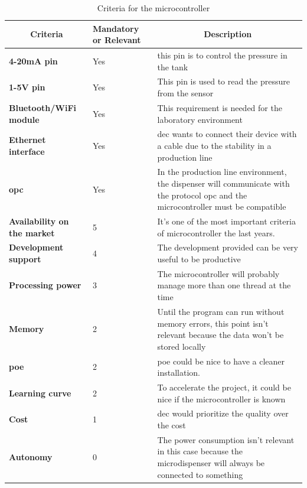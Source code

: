 \begin{table}[ht]
    \centering
    \begin{tabular}{|p{2.6cm}|p{2cm}|p{8cm}|}
    \hline
    \multicolumn{1}{|c|}{\textbf{Criteria}} &
      \textbf{Mandatory or Relevant} &
      \multicolumn{1}{c|}{\textbf{Description}} \\ \hline
      \textbf{4-20mA pin}                  & Yes & this pin is to control the pressure in the tank \\ \hline
      \textbf{1-5V pin}                    & Yes & This pin is used to read the pressure from the sensor \\ \hline
      \textbf{Bluetooth/WiFi module}       & Yes & This requirement is needed for the laboratory environment \\ \hline
      \textbf{Ethernet interface}          & Yes & \acrshort{dec} wants to connect their device with a cable due to the stability in a production line \\ \hline
      \textbf{\acrshort{opc}}              & Yes & In the production line environment, the dispenser will communicate with the protocol \acrshort{opc} and the microcontroller must be compatible \\ \hline
      \textbf{Availability on the market} & 5 & It's one of the most important criteria of microcontroller the last years.\\ \hline
      \textbf{Development support}         & 4 & The development provided can be very useful to be productive \\ \hline
      \textbf{Processing power}            & 3 & The microcontroller will probably manage more than one thread at the time \\ \hline
      \textbf{Memory}                      & 2 & Until the program can run without memory errors, this point isn't relevant because the data won't be stored locally \\ \hline
      \textbf{\acrshort{poe}}              & 2 & \acrfull{poe} could be nice to have a cleaner installation. \\ \hline
      \textbf{Learning curve}              & 2 & To accelerate the project, it could be nice if the microcontroller is known \\ \hline
      \textbf{Cost}                        & 1 & \acrshort{dec} would prioritize the quality over the cost \\ \hline
    \textbf{Autonomy} &
      0 &
      The power consumption isn't relevant in this case because the microdispenser will always be connected to something \\ \hline
    \end{tabular}
    \caption{Criteria for the microcontroller}
    \label{tab:analysis:mcu:criteria}
\end{table}

